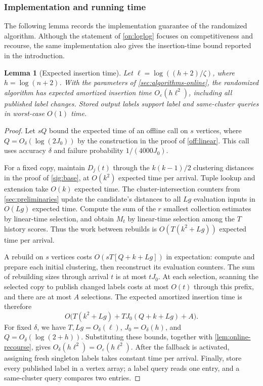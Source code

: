 \documentclass[11pt]{article}
\newtheorem{lemma}[theorem]{Lemma}
\begin{document}
\subsubsection{Implementation and running time}

The following lemma records the implementation guarantee of the
randomized algorithm. Although the statement of \cref{on:loglog}
focuses on competitiveness and recourse, the same implementation
also gives the insertion-time bound reported in the introduction.

\begin{lemma}[Expected insertion time]
\label{lem:online-time}
Let $\ell=\log((h+2)/\zeta)$, where $h=\log(n+2)$. With the
parameters of \cref{sec:algorithms-online}, the randomized algorithm
has expected amortized insertion time $O_\varepsilon(h\ell^2)$,
including all published label changes. Stored output labels support
label and same-cluster queries in worst-case $O(1)$ time.
\end{lemma}
\begin{proof}
Let $sQ$ bound the expected time of an offline call on $s$ vertices,
where $Q=O_\delta(\log(2J_0))$ by the construction in the proof of
\cref{off:linear}. This call uses accuracy $\delta$ and failure
probability $1/(4000J_0)$.

For a fixed copy, maintain $D_j(t)$ through the $k(k-1)/2$
clustering distances in the proof of \cref{sig:base}, at $O(k^2)$
expected time per arrival. Tuple lookup and extension take $O(k)$
expected time. The cluster-intersection counters from
\cref{sec:preliminaries} update the candidate's distances to all
$Lg$ evaluation inputs in $O(Lg)$ expected time. Compute the sum
of the $r$ smallest collection estimates by linear-time selection,
and obtain $M_t$ by linear-time selection among the $T$ history
scores. Thus the work between rebuilds is
$O(T(k^2+Lg))$ expected time per arrival.

A rebuild on $s$ vertices costs $O(sT[Q+k+Lg])$ in expectation:
compute and prepare each initial clustering, then reconstruct its
evaluation counters. The sum of rebuilding sizes through arrival
$t$ is at most $tJ_0$. At each selection, scanning the selected
copy to publish changed labels costs at most $O(t)$ through this
prefix, and there are at most $A$ selections. The expected amortized
insertion time is therefore
\[
 O\bigl(T(k^2+Lg)+TJ_0(Q+k+Lg)+A\bigr).
\]
For fixed $\delta$, we have $T,Lg=O_\delta(\ell)$,
$J_0=O_\delta(h)$, and $Q=O_\delta(\log(2+h))$. Substituting
these bounds, together with \cref{lem:online-recourse}, gives
$O_\delta(h\ell^2)=O_\varepsilon(h\ell^2)$. After the fallback
is activated, assigning fresh singleton labels takes constant time
per arrival. Finally, store every published label in a vertex array;
a label query reads one entry, and a same-cluster query compares two
entries.
\end{proof}
\end{document}

